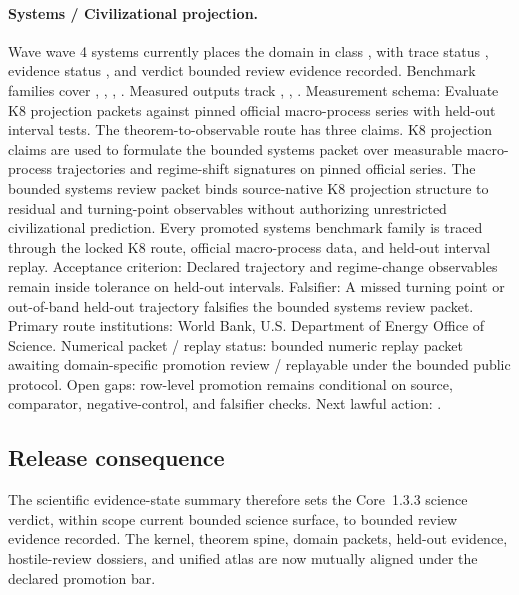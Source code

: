 \paragraph{Systems / Civilizational projection.}
Wave wave 4 systems currently places the domain in class , with trace status , evidence status , and verdict bounded review evidence recorded.
Benchmark families cover , \allowbreak {}, \allowbreak {}, \allowbreak {}.
Measured outputs track , \allowbreak {}, \allowbreak {}.
Measurement schema: Evaluate K8 projection packets against pinned official macro-process series with held-out interval tests.
The theorem-to-observable route has three claims. K8 projection claims are used to formulate the bounded systems packet over measurable macro-process trajectories and regime-shift signatures on pinned official series. The bounded systems review packet binds source-native K8 projection structure to residual and turning-point observables without authorizing unrestricted civilizational prediction. Every promoted systems benchmark family is traced through the locked K8 route, official macro-process data, and held-out interval replay.
Acceptance criterion: Declared trajectory and regime-change observables remain inside tolerance on held-out intervals.
Falsifier: A missed turning point or out-of-band held-out trajectory falsifies the bounded systems review packet.
Primary route institutions: World Bank, \allowbreak U.S. Department of Energy Office of Science.
Numerical packet / replay status: bounded numeric replay packet awaiting domain-specific promotion review / replayable under the bounded public protocol.
Open gaps: row-level promotion remains conditional on source, comparator, negative-control, and falsifier checks.
Next lawful action: .

\subsection{Release consequence}
The scientific evidence-state summary therefore sets the Core~1.3.3 science verdict, within scope current bounded science surface, to bounded review evidence recorded.
The kernel, theorem spine, domain packets, held-out evidence, hostile-review dossiers, and unified atlas are now mutually aligned under the declared promotion bar.

